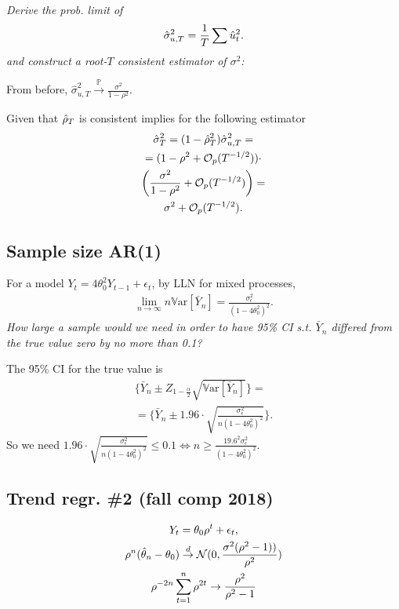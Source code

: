 \documentclass[9pt]{extarticle}
\newcommand{\PP}{\mathbb{P}}
\newcommand{\var}{\mathbb{V}\text{ar}}
\newcommand{\OO}{\mathcal{O}}
\newcommand{\darrow}{\overset{d}{\rightarrow}}
\newcommand{\parrow}{\overset{\PP}{\rightarrow}}
\begin{document}
\begin{multicols*}{4}
\emph{Derive the prob. limit of}
\begin{gather*}
    \hat{\sigma}_{u,T}^2 = \frac{1}{T}\sum \hat{u}_t^2.
\end{gather*}
\emph{and construct a root-$T$ consistent estimator of $\sigma^2$:}

From before, $\hat{\sigma}_{u,T}^2 \parrow \frac{\sigma^2}{1-\rho^2}$.

Given that $\hat{\rho}_T$ is consistent implies for the following estimator
\begin{gather*}
    \hat{\sigma}_T^2 = (1-\hrho_T^2)\hat{\sigma}_{u,T}^2 = \\
    = (1-\rho^2 + \OO_p(T^{-1/2})) \cdot \\
    \left(\frac{\sigma^2}{1-\rho^2} + \OO_p(T^{-1/2})\right) = \\
    \sigma^2 + \OO_p(T^{-1/2}).
\end{gather*}






\subsection*{Sample size AR(1)}
For a model $Y_t = 4\theta_0^2 Y_{t-1} + \epsilon_t$, by LLN for mixed processes,
\begin{gather*}
    \lim_{n\rightarrow \infty} n \var[\bar{Y}_n] = \frac{\sigma_\epsilon^2}{(1- 4 \theta_0^2)^2}.
\end{gather*}
\emph{How large a sample would we need in order to have 95\% CI s.t. $\bar{Y}_n$ differed from the true value zero by no more than 0.1?}

The 95\% CI for the true value is
\begin{gather*}
    \{\bar{Y}_n \pm Z_{1-\frac{\alpha}{2}} \sqrt{\var[\bar{Y}_n]} \} = \\
    = \{\bar{Y}_n \pm 1.96 \cdot \sqrt{\frac{\sigma_\epsilon^2}{n(1-4\theta_0^2)^2}} \}.
\end{gather*}
So we need $1.96 \cdot \sqrt{\frac{\sigma_\epsilon^2}{n(1-4\theta_0^2)^2}} \leq 0.1 \Leftrightarrow n \geq \frac{19.6^2 \sigma_\epsilon^2}{(1-4\theta_0^2)^2}$.

\subsection*{Trend regr. \#2 (fall comp 2018)}
\begin{gather*}
    Y_t = \theta_0 \rho^t + \epsilon_t, \\
    \rho^n(\htt_n - \theta_0) \darrow \mathcal{N}(0, \frac{\sigma^2(\rho^2-1))}{\rho^2}) \\
    \rho^{-2n}\sum_{t=1}^n \rho^{2t} \rightarrow \frac{\rho^2}{\rho^2-1}
\end{gather*}


\end{multicols*}
\end{document}
